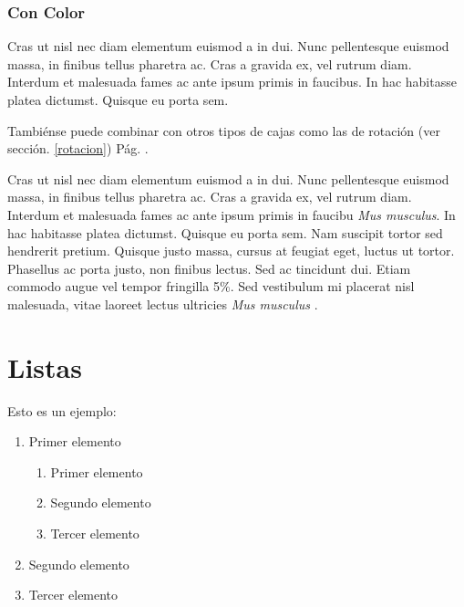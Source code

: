 \documentclass[b5paper, 10pt]{book}
\newcommand{\mm}{\emph{Mus musculus} }
\begin{document}
\subsubsection{Con Color}


\begin{shaded}
	\begin{framed}
Cras ut nisl nec diam elementum euismod a in dui. Nunc pellentesque euismod massa, in finibus tellus pharetra ac. Cras a gravida ex, vel rutrum diam. Interdum et malesuada fames ac ante ipsum primis in faucibus. In hac habitasse platea dictumst. Quisque eu porta sem.

\end{framed}
\end{shaded}

Tambiénse puede combinar con otros tipos de cajas como las de rotación (ver sección. \ref{rotacion}) Pág. \pageref{rotacion}.

Cras ut nisl nec diam elementum euismod a in dui. Nunc pellentesque euismod massa, in finibus tellus pharetra ac. Cras a gravida ex, vel rutrum diam. Interdum et malesuada fames ac ante ipsum primis in faucibu \emph{Mus musculus}. In hac habitasse platea dictumst. Quisque eu porta sem. Nam suscipit tortor sed hendrerit pretium. Quisque justo massa, cursus at feugiat eget, luctus ut tortor. Phasellus ac porta justo, non finibus lectus. Sed ac tincidunt dui. Etiam commodo augue vel tempor fringilla 5\%. Sed vestibulum mi placerat nisl malesuada, vitae laoreet lectus ultricies \mm.

\section {Listas}
Esto es un ejemplo: 

\begin{enumerate}
	\item Primer elemento
	
		\begin{enumerate}
			\item Primer elemento
			\item Segundo elemento
			\item Tercer elemento
		\end{enumerate}
	\item Segundo elemento
	\item Tercer elemento
	
\end{enumerate}
\end{document}
